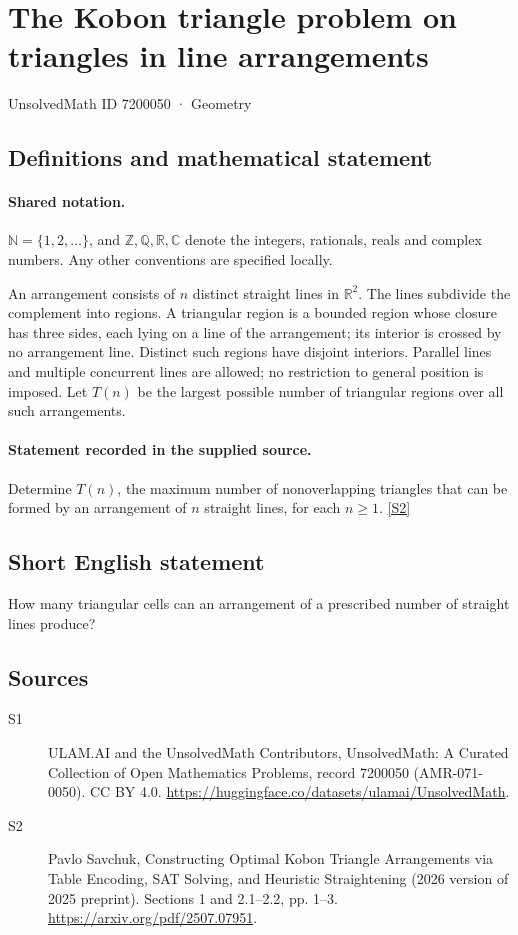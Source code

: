 \documentclass[11pt]{article}
\newcommand{\sref}[2]{\hyperlink{source:#1:#2}{[S#2]}}
\begin{document}
\setcounter{section}{7200049}
\section{The Kobon triangle problem on triangles in line arrangements}\label{7200050}
{\small\sffamily UnsolvedMath ID 7200050 · Geometry}
\subsection{Definitions and mathematical statement}

\paragraph{Shared notation.}$\mathbb N=\{1,2,\ldots\}$, and $\mathbb Z,\mathbb Q,\mathbb R,\mathbb C$ denote the integers, rationals, reals and complex numbers. Any other conventions are specified locally.


An arrangement consists of $n$ distinct straight lines in $\mathbb R^2$. The lines subdivide the complement into regions. A triangular region is a bounded region whose closure has three sides, each lying on a line of the arrangement; its interior is crossed by no arrangement line. Distinct such regions have disjoint interiors. Parallel lines and multiple concurrent lines are allowed; no restriction to general position is imposed. Let $T(n)$ be the largest possible number of triangular regions over all such arrangements.
\paragraph{Statement recorded in the supplied source.}
Determine $T(n)$, the maximum number of nonoverlapping triangles that can be formed by an arrangement of $n$ straight lines, for each $n\geq1$. \sref{7200050}{2}
\subsection{Short English statement}
How many triangular cells can an arrangement of a prescribed number of straight lines produce?
\subsection{Sources}
\begin{description}
\item[\hypertarget{source:7200050:1}{S1}] ULAM.AI and the UnsolvedMath Contributors, UnsolvedMath: A Curated Collection of Open Mathematics Problems, record 7200050 (AMR-071-0050). CC BY 4.0. \url{https://huggingface.co/datasets/ulamai/UnsolvedMath}.
\item[\hypertarget{source:7200050:2}{S2}] Pavlo Savchuk, Constructing Optimal Kobon Triangle Arrangements via Table Encoding, SAT Solving, and Heuristic Straightening (2026 version of 2025 preprint). Sections 1 and 2.1–2.2, pp. 1–3. \url{https://arxiv.org/pdf/2507.07951}.
\end{description}
\label{end:7200050}
\end{document}
